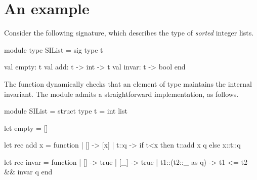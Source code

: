 \section{An example}

Consider the following signature, which describes the type of \emph{sorted}
integer lists.
%
\begin{ocamlcode}
module type SIList = sig
  type t

  val empty: t
  val add: t -> int -> t
  val invar: t -> bool
end
\end{ocamlcode}
%
The  function dynamically checks that an element of type 
maintains the internal invariant. The module admits a straightforward
implementation, as follows.
%
\begin{ocamlcode}
module SIList = struct
  type t = int list

  let empty = []

  let rec add x = function
    | [] -> [x]
    | t::q -> if t<x then t::add x q else x::t::q

  let rec invar = function
    | [] -> true
    | [_] -> true
    | t1::(t2::_ as q) -> t1 <= t2 && invar q
end
\end{ocamlcode}

